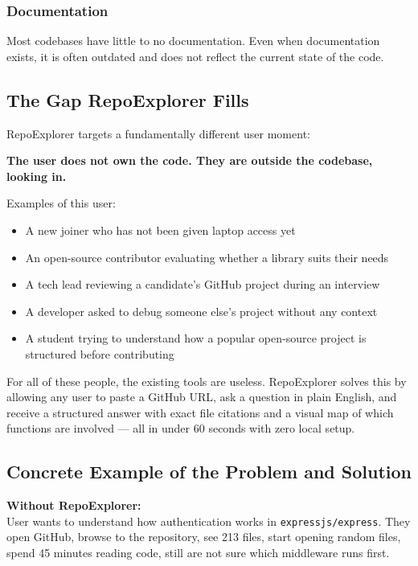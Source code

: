 \documentclass[a4paper,11pt]{article}
\begin{document}
\subsubsection{Documentation}
Most codebases have little to no documentation. Even when documentation exists, it is often outdated and does not reflect the current state of the code.

\subsection{The Gap RepoExplorer Fills}

RepoExplorer targets a fundamentally different user moment:

\begin{mdframed}[style=notebox]
\textbf{The user does not own the code. They are outside the codebase, looking in.}
\end{mdframed}

\noindent Examples of this user:
\begin{itemize}
    \item A new joiner who has not been given laptop access yet
    \item An open-source contributor evaluating whether a library suits their needs
    \item A tech lead reviewing a candidate's GitHub project during an interview
    \item A developer asked to debug someone else's project without any context
    \item A student trying to understand how a popular open-source project is structured before contributing
\end{itemize}

For all of these people, the existing tools are useless. RepoExplorer solves this by allowing any user to paste a GitHub URL, ask a question in plain English, and receive a structured answer with exact file citations and a visual map of which functions are involved --- all in under 60 seconds with zero local setup.

\subsection{Concrete Example of the Problem and Solution}

\textbf{Without RepoExplorer:}\\
User wants to understand how authentication works in \texttt{expressjs/express}. They open GitHub, browse to the repository, see 213 files, start opening random files, spend 45 minutes reading code, still are not sure which middleware runs first.
\end{document}
